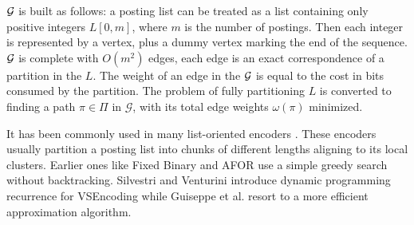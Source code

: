 \documentclass{sig-alternate-05-2015}
\begin{document}
$ \cal G $ is built as follows: a posting list can be treated as a list containing only positive integers $ L[0,m] $, where $ m $ is the number of postings.
Then each integer is represented by a vertex, plus a dummy vertex marking the end of the sequence.
$ \cal G $ is complete with $ O(m^2) $ edges, each edge is an exact correspondence of a partition in the $ L $.
The weight of an edge in the $ \cal G $ is equal to the cost in bits consumed by the partition.
The problem of fully partitioning $ L $ is converted to finding a path $\pi \in \Pi $ in $\mathcal{G}$, with its total edge weights $ \omega(\pi) $ minimized.

It has been commonly used in many list-oriented encoders \cite{song2016optimizing}.
These encoders usually partition a posting list into chunks of different lengths aligning to its local clusters.
Earlier ones like Fixed Binary \cite{anh2004index} and AFOR \cite{delbru2010adaptive} use a simple greedy search without backtracking.
Silvestri and Venturini introduce dynamic programming recurrence for VSEncoding \cite{silvestri2010vsencoding} while Guiseppe et al. resort to a more efficient approximation algorithm.
\end{document}
